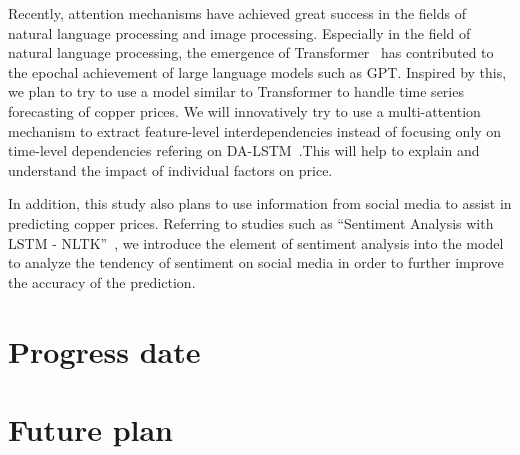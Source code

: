\documentclass[project-plan]{report-template}
\begin{document}
\noindent Recently, attention mechanisms have achieved great success in the fields of natural language processing and image processing. Especially in the field of natural language processing, the emergence of Transformer~\cite{li2019enhancing, vaswani2017attention} has contributed to the epochal achievement of large language models such as GPT. Inspired by this, we plan to try to use a model similar to Transformer to handle time series forecasting of copper prices. We will innovatively try to use a multi-attention mechanism to extract feature-level interdependencies instead of focusing only on time-level dependencies refering on DA-LSTM~\cite{qin2017dualstage}.This will help to explain and understand the impact of individual factors on price.

\noindent In addition, this study also plans to use information from social media to assist in predicting copper prices. Referring to studies such as “Sentiment Analysis with LSTM - NLTK”~\cite{8848203}, we introduce the element of sentiment analysis into the model to analyze the tendency of sentiment on social media in order to further improve the accuracy of the prediction.

\section{Progress date}

\section{Future plan}

\end{document}

